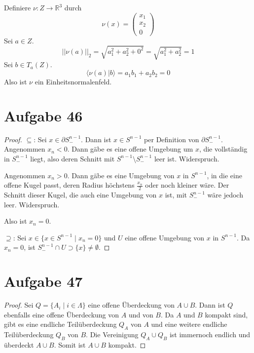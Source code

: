 \documentclass[10pt,a4paper]{article}
\begin{document}
Definiere $\nu : Z \rightarrow \mathbb{R}^{3}$ durch
\begin{equation}
  \nu(x) = \begin{pmatrix}
    x_{1}\\x_{2}\\0
  \end{pmatrix}
\end{equation}
Sei $a \in Z$.
\begin{equation}
  ||\nu(a)||_{2} = \sqrt{a_{1}^{2} + a_{2}^{2} + 0^{2}} = \sqrt{a_{1}^{2} + a_{2}^{2}} = 1
\end{equation}
Sei $b \in T_{a}(Z)$.
\begin{equation}
  \langle \nu(a) | b \rangle = a_{1}b_{1} + a_{2}b_{2} = 0
\end{equation}
Also ist $\nu$ ein Einheitsnormalenfeld.

\section{Aufgabe 46}

\begin{proof}
  $\subseteq$: Sei $x \in \partial S_{-}^{n - 1}$.
  Dann ist $x \in S^{n - 1}$ per Definition von $\partial S_{-}^{n - 1}$.
  Angenommen $x_{n} < 0$.
  Dann gäbe es eine offene Umgebung um $x$, die vollständig in $S_{-}^{n - 1}$ liegt, also deren Schnitt mit $S^{n - 1} \setminus S_{-}^{n - 1}$ leer ist.
  Widerspruch.

  Angenommen $x_{n} > 0$.
  Dann gäbe es eine Umgebung von $x$ in $S^{n - 1}$, in die eine offene Kugel passt, deren Radius höchstens $\frac{x_{n}}{2}$ oder noch kleiner wäre.
  Der Schnitt dieser Kugel, die auch eine Umgebung von $x$ ist, mit $S_{-}^{n - 1}$ wäre jedoch leer.
  Widerspruch.

  Also ist $x_{n} = 0$.

  $\supseteq$: Sei $x \in \{ x \in S^{n - 1} \mid x_{n} = 0 \}$ und $U$ eine offene Umgebung von $x$ in $S^{n - 1}$.
  Da $x_{n} = 0$, ist $S_{-}^{n - 1} \cap U \supset \{ x \} \ne \emptyset$.
\end{proof}

\section{Aufgabe 47}

\begin{proof}
  Sei $Q = \{ A_{i} \mid i \in \Lambda \}$ eine offene Überdeckung von $A \cup B$.
  Dann ist $Q$ ebenfalls eine offene Überdeckung von $A$ und von $B$.
  Da $A$ und $B$ kompakt sind, gibt es eine endliche Teilüberdeckung $Q_{A}$ von $A$ und eine weitere endliche Teilüberdeckung $Q_{B}$ von $B$.
  Die Vereinigung $Q_{A} \cup Q_{B}$ ist immernoch endlich und überdeckt $A \cup B$.
  Somit ist $A \cup B$ kompakt.
\end{proof}
\end{document}
